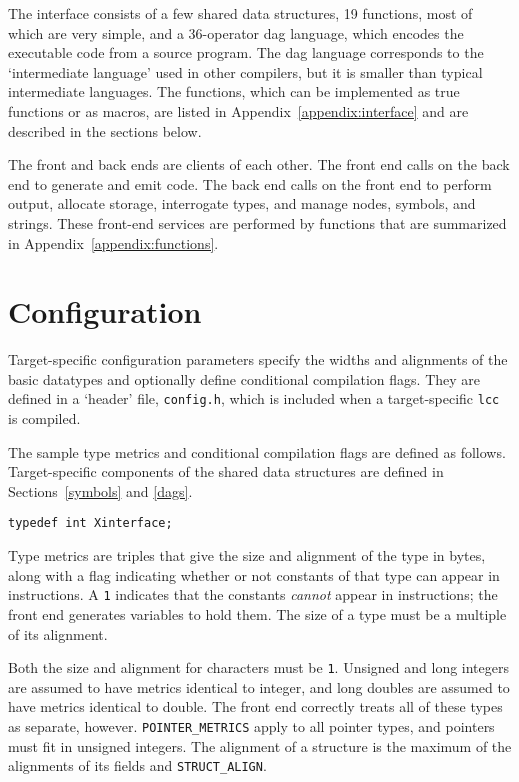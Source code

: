 The interface consists of a few shared data structures, 19 functions,
most of which are very simple, and a 36-operator dag language, which
encodes the executable code from a source program. The dag language
corresponds to the `intermediate language' used in other compilers, but
it is smaller than typical intermediate languages.
The functions, which can be implemented as true functions or as macros,
are listed in Appendix~\ref{appendix:interface} and are
described in the sections below.

The front and back ends are clients of each other.  The front end calls
on the back end to generate and emit code.  The back end calls on the
front end to perform output, allocate storage, interrogate types, and
manage nodes, symbols, and strings. These front-end services are
performed by functions that are summarized in Appendix~\ref{appendix:functions}.


\section{Configuration}

\label{configuration}
Target-specific configuration parameters specify the widths and
alignments of the basic datatypes and optionally define conditional
compilation flags.  They are defined in a `header' file, \verb|config.h|,
which is included when a target-specific \verb|lcc| is compiled.

The sample type metrics
and conditional compilation flags are defined as follows.
Target-specific components of the shared data structures
are defined in Sections~\ref{symbols} and \ref{dags}.
\begin{verbatim}
typedef int Xinterface;
\end{verbatim}

Type metrics are triples that give the size and alignment of the type
in bytes, along with a flag indicating whether or not constants of that
type can appear in instructions. A \verb|1| indicates that the
constants {\em cannot} appear in instructions; the front end generates
variables to hold them. The size of a type must be a multiple of its alignment.

Both the size and alignment for characters must be \verb|1|.
Unsigned and long integers are assumed to have metrics
identical to integer, and long doubles are assumed to have metrics
identical to double. The front end correctly treats all of these types
as separate, however.
\verb|POINTER_METRICS| apply to all pointer types, and pointers
must fit in unsigned integers.
The alignment of a structure is the maximum of the alignments
of its fields and \verb|STRUCT_ALIGN|.

